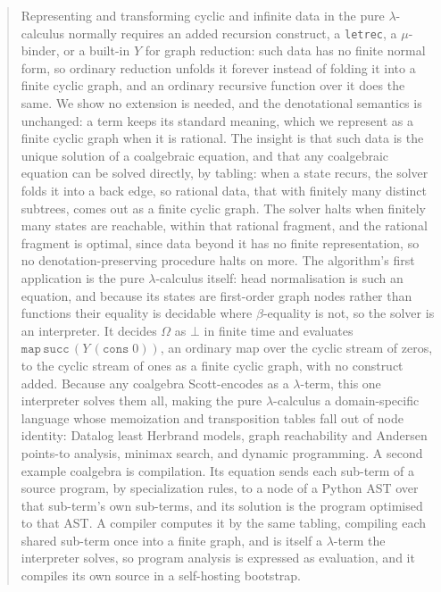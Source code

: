 \begin{abstract}
  Representing and transforming cyclic and infinite data in the pure $\lambda$-calculus normally requires an added recursion construct, a \texttt{letrec}, a $\mu$-binder, or a built-in $Y$ for graph reduction: such data has no finite normal form, so ordinary reduction unfolds it forever instead of folding it into a finite cyclic graph, and an ordinary recursive function over it does the same. We show no extension is needed, and the denotational semantics is unchanged: a term keeps its standard meaning, which we represent as a finite cyclic graph when it is rational. The insight is that such data is the unique solution of a coalgebraic equation, and that any coalgebraic equation can be solved directly, by tabling: when a state recurs, the solver folds it into a back edge, so rational data, that with finitely many distinct subtrees, comes out as a finite cyclic graph. The solver halts when finitely many states are reachable, within that rational fragment, and the rational fragment is optimal, since data beyond it has no finite representation, so no denotation-preserving procedure halts on more. The algorithm's first application is the pure $\lambda$-calculus itself: head normalisation is such an equation, and because its states are first-order graph nodes rather than functions their equality is decidable where $\beta$-equality is not, so the solver is an interpreter. It decides $\Omega$ as $\bot$ in finite time and evaluates $\mathtt{map}\,\mathtt{succ}\,(Y\,(\mathtt{cons}\;0))$, an ordinary map over the cyclic stream of zeros, to the cyclic stream of ones as a finite cyclic graph, with no construct added. Because any coalgebra Scott-encodes as a $\lambda$-term, this one interpreter solves them all, making the pure $\lambda$-calculus a domain-specific language whose memoization and transposition tables fall out of node identity: Datalog least Herbrand models, graph reachability and Andersen points-to analysis, minimax search, and dynamic programming. A second example coalgebra is compilation. Its equation sends each sub-term of a source program, by specialization rules, to a node of a Python AST over that sub-term's own sub-terms, and its solution is the program optimised to that AST. A compiler computes it by the same tabling, compiling each shared sub-term once into a finite graph, and is itself a $\lambda$-term the interpreter solves, so program analysis is expressed as evaluation, and it compiles its own source in a self-hosting bootstrap.
\end{abstract}

